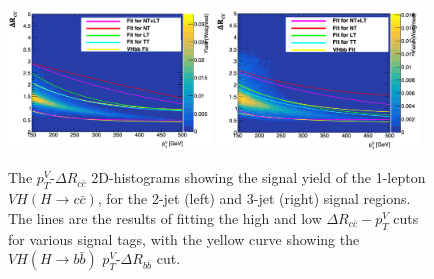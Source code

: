 \begin{figure}[h!]
    \center
    \includegraphics[width=0.48\textwidth]{Images/VH/dRccpTV/sr1.png}
    \includegraphics[width=0.48\textwidth]{Images/VH/dRccpTV/sr2.png}
    \caption{The $p_T^V$-$\Delta R_{c\bar{c}}$ 2D-histograms showing the signal yield of the 1-lepton $VH(H\rightarrow c\bar{c})$, for the 2-jet (left) and 3-jet (right) signal regions. The lines are the results of fitting the high and low $\Delta R_{c\bar{c}}-p_T^V$ cuts for various signal tags, with the yellow curve showing the $VH(H\rightarrow b\bar{b})$ $p_T^V$-$\Delta R_{b\bar{b}}$ cut.} 
    \label{fig:drccptvCutsVHcc}
\end{figure}

